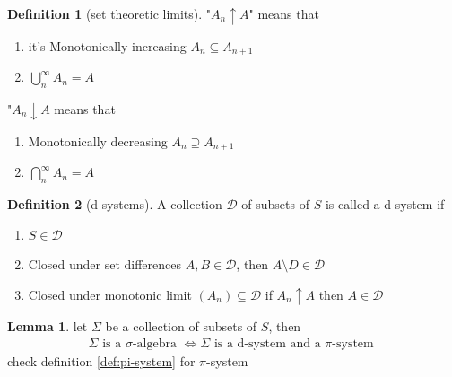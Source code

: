 \documentclass[12pt]{article}
\theoremstyle{definition}
\newtheorem{definition}{Definition}[section]
\newtheorem{lemma}[theorem]{Lemma}
\begin{document}
\begin{definition}[set theoretic limits]
"$A_n \uparrow A$" means that 
\begin{enumerate}
	\item it's Monotonically increasing $A_n \subseteq A_{n+1}$
	\item $\bigcup_n^\infty A_n = A$
\end{enumerate}
"$A_n \downarrow A$ means that 
\begin{enumerate}
	\item Monotonically decreasing $A_n \supseteq A_{n+1}$ 
	\item $\bigcap_n^\infty A_n = A$
\end{enumerate}
	
\end{definition}
	\begin{definition}[d-systems]
			A collection $\mathcal{D}$ of subsets of $S$ is called a d-system if 
			\begin{enumerate}
				\item $S \in \mathcal{D}$ 
				\item Closed under set differences $A, B \in \mathcal{D}$, then $A \setminus D \in \mathcal{D}$ 
				\item Closed under monotonic limit $(A_n) \subseteq \mathcal{D}$ if $A_n \uparrow A$ then $A \in \mathcal{D}$ 
			\end{enumerate}
	\end{definition}	
	\begin{lemma}
		let $\Sigma$ be a collection of subsets of $S$, then 
		\begin{align*}
			\Sigma \text{ is a $\sigma$-algebra } \iff \Sigma \text{ is a d-system and a $\pi$-system } 
		\end{align*}
		check definition \ref{def:pi-system} for $\pi$-system
	\end{lemma}
\end{document}
